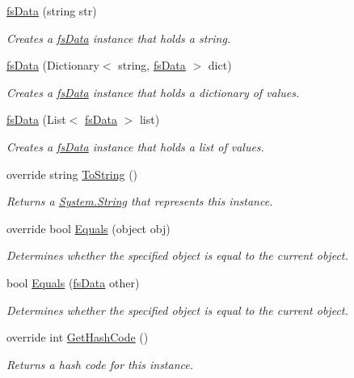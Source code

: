 \begin{DoxyCompactItemize}
\hyperlink{class_full_serializer_1_1fs_data_a18d00eb27ffcbbd57ab7372856ae30f7}{fs\+Data} (string str)
\begin{DoxyCompactList}\small\item\em Creates a \hyperlink{class_full_serializer_1_1fs_data}{fs\+Data} instance that holds a string. \end{DoxyCompactList}\item 
\hyperlink{class_full_serializer_1_1fs_data_a8897bc4f6c2f0ff7acdcd0195746fc09}{fs\+Data} (Dictionary$<$ string, \hyperlink{class_full_serializer_1_1fs_data}{fs\+Data} $>$ dict)
\begin{DoxyCompactList}\small\item\em Creates a \hyperlink{class_full_serializer_1_1fs_data}{fs\+Data} instance that holds a dictionary of values. \end{DoxyCompactList}\item 
\hyperlink{class_full_serializer_1_1fs_data_af6e99c4d2e08a96957ccd44491026e92}{fs\+Data} (List$<$ \hyperlink{class_full_serializer_1_1fs_data}{fs\+Data} $>$ list)
\begin{DoxyCompactList}\small\item\em Creates a \hyperlink{class_full_serializer_1_1fs_data}{fs\+Data} instance that holds a list of values. \end{DoxyCompactList}\item 
override string \hyperlink{class_full_serializer_1_1fs_data_ac64cd3d8fa914d376259ff913c208791}{To\+String} ()
\begin{DoxyCompactList}\small\item\em Returns a \hyperlink{namespace_full_serializer_a6eee33d63b94e40fdfcfc59af9fcfc82a27118326006d3829667a400ad23d5d98}{System.\+String} that represents this instance. \end{DoxyCompactList}\item 
override bool \hyperlink{class_full_serializer_1_1fs_data_a29d15c3ea23372768eea41226c322415}{Equals} (object obj)
\begin{DoxyCompactList}\small\item\em Determines whether the specified object is equal to the current object. \end{DoxyCompactList}\item 
bool \hyperlink{class_full_serializer_1_1fs_data_a31f0be7076e3aeea8051eef9b4bff6c3}{Equals} (\hyperlink{class_full_serializer_1_1fs_data}{fs\+Data} other)
\begin{DoxyCompactList}\small\item\em Determines whether the specified object is equal to the current object. \end{DoxyCompactList}\item 
override int \hyperlink{class_full_serializer_1_1fs_data_a915cae40a9014f6027c2b88e35d74e8c}{Get\+Hash\+Code} ()
\begin{DoxyCompactList}\small\item\em Returns a hash code for this instance. \end{DoxyCompactList}\end{DoxyCompactItemize}
